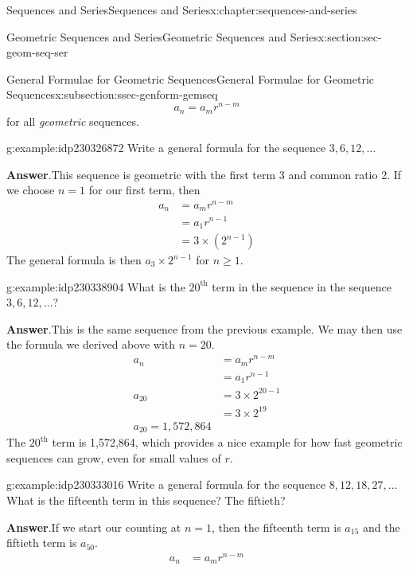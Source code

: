 \documentclass[twoside,10pt,]{book}
\newcommand{\blocktitlefont}{\relax}
\numberwithin{equation}{section}
\newcommand{\upth}[1]{{#1^{\text{th}}}}
\newcommand{\amp}{&}
\begin{document}
\begin{chapterptx}{Sequences and Series}{}{Sequences and Series}{}{}{x:chapter:sequences-and-series}
\begin{sectionptx}{Geometric Sequences and Series}{}{Geometric Sequences and Series}{}{}{x:section:sec-geom-seq-ser}
\begin{subsectionptx}{General Formulae for Geometric Sequences}{}{General Formulae for Geometric Sequences}{}{}{x:subsection:ssec-genform-gemseq}
\begin{equation*}
a_n=a_m r^{n-m}
\end{equation*}
for all \emph{geometric} sequences. \begin{example}{}{g:example:idp230326872}%
Write a general formula for the sequence \(3, 6, 12, \ldots\)\par\smallskip%
\noindent\textbf{\blocktitlefont Answer}.\label{g:answer:idp230332504}{}\hypertarget{g:answer:idp230332504}{}\quad{}This sequence is geometric with the first term 3 and common ratio 2.  If we choose \(n = 1\) for our first term, then%
\begin{align*}
a_n \amp = a_m r^{n-m}\\
\amp = a_1 r^{n-1}\\
\amp = 3\times\left(2^{n-1}\right)
\end{align*}
The general formula is then \(a_3\times 2^{n-1}\) for \(n\ge 1\).\end{example}
 \begin{example}{}{g:example:idp230338904}%
What is the \(\upth{20}\) term in the sequence in the sequence \(3, 6, 12, \ldots\)?\par\smallskip%
\noindent\textbf{\blocktitlefont Answer}.\label{g:answer:idp230339928}{}\hypertarget{g:answer:idp230339928}{}\quad{}This is the same sequence from the previous example.  We may then use the formula we derived above with \(n = 20\).%
\begin{align*}
a_n\amp = a_m r^{n-m}\\
\amp = a_1 r^{n-1}\\
a_{20}\amp = 3\times 2^{20-1}\\
\amp = 3\times 2^{19}\\
a_{20}=1,572,864
\end{align*}
The \(\upth{20}\) term is 1,572,864, which provides a nice example for how fast geometric sequences can grow, even for small values of \(r\).\end{example}
 \begin{example}{}{g:example:idp230333016}%
Write a general formula for the sequence \(8, 12, 18, 27, \ldots\)  What is the fifteenth term in this sequence?  The fiftieth?\par\smallskip%
\noindent\textbf{\blocktitlefont Answer}.\label{g:answer:idp230339544}{}\hypertarget{g:answer:idp230339544}{}\quad{}If we start our counting at \(n=1\), then the fifteenth term is \(a_{15}\) and the fiftieth term is \(a_{50}\).%
\begin{align*}
a_n\amp = a_m r^{n-m}\\

\end{align*}
\end{example}
\end{subsectionptx}
\end{sectionptx}
\end{chapterptx}
\end{document}
